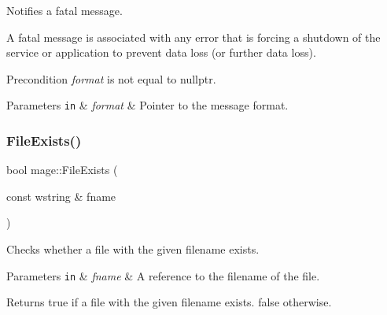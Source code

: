 Notifies a fatal message.

A fatal message is associated with any error that is forcing a shutdown of the service or application to prevent data loss (or further data loss).

\begin{DoxyPrecond}{Precondition}
{\itshape format} is not equal to {\ttfamily nullptr}. 
\end{DoxyPrecond}

\begin{DoxyParams}[1]{Parameters}
\mbox{\tt in}  & {\em format} & Pointer to the message format. \\
\hline
\end{DoxyParams}
\hypertarget{namespacemage_a3e9bead16bf9814e6ecd6aca57ccc3e3}{}\label{namespacemage_a3e9bead16bf9814e6ecd6aca57ccc3e3} 
\subsubsection{\texorpdfstring{File\+Exists()}{FileExists()}}
{\footnotesize\ttfamily bool mage\+::\+File\+Exists (\begin{DoxyParamCaption}\item[{const wstring \&}]{fname }\end{DoxyParamCaption})\hspace{0.3cm}{\ttfamily [noexcept]}}

Checks whether a file with the given filename exists.


\begin{DoxyParams}[1]{Parameters}
\mbox{\tt in}  & {\em fname} & A reference to the filename of the file. \\
\hline
\end{DoxyParams}
\begin{DoxyReturn}{Returns}
{\ttfamily true} if a file with the given filename exists. {\ttfamily false} otherwise. 
\end{DoxyReturn}
\hypertarget{namespacemage_ac20162a68be6828c38072a3afb0711c1}{}\label{namespacemage_ac20162a68be6828c38072a3afb0711c1} 
